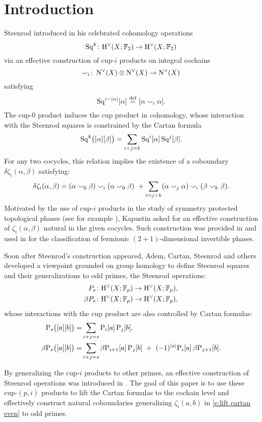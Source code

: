 
\section{Introduction} \label{s:introduction}

Steenrod introduced in \cite{steenrod1947products} his celebrated cohomology operations
\begin{equation*}
	\operatorname{Sq}^k \colon \mathrm{H}^\vee(X; {\mathbb{F}_2}) \to \mathrm{H}^\vee(X; {\mathbb{F}_2})
\end{equation*}
via an effective construction of cup-$i$ products on integral cochains
\[
\smallsmile_i \colon \operatorname{N^{\vee}}(X) \otimes \operatorname{N^{\vee}}(X) \to \operatorname{N^{\vee}}(X)
\]
satisfying
\[
\operatorname{Sq}^{i-\lvert\alpha\rvert}[\alpha] \stackrel{\mathrm{def}}{=} [\alpha \smallsmile_i \alpha].
\]
The cup-$0$ product induces the cup product in cohomology, whose interaction with the Steenrod squares is constrained by the Cartan formula
\[
\operatorname{Sq}^k\!\big([\alpha] [\beta]\big) = \sum_{i+j=k} \operatorname{Sq}^i [\alpha] \operatorname{Sq}^j[\beta].
\]
For any two cocycles, this relation implies the existence of a coboundary $\delta\zeta_i(\alpha,\beta)$ satisfying:
\begin{equation}\label{e:lift cartan even}
	\delta\zeta_i(\alpha, \beta) =
	(\alpha \smallsmile_0 \beta) \smallsmile_i (\alpha \smallsmile_0 \beta) \ +
	\sum_{i=j+k} (\alpha \smallsmile_j \alpha) \smallsmile_i (\beta \smallsmile_k \beta).
\end{equation}
Motivated by the use of cup-$i$ products in the study of symmetry protected topological phases (see for example \cite{kapustin2015cobordism, gaiotto2016spin, kapustin2017fermionic}), Kapustin asked for an effective construction of $\zeta_i(\alpha, \beta)$ natural in the given cocycles.
Such construction was provided in \cite{medina2020cartan} and used in \cite{barkeshli2021classification} for the classification of fermionic $(2+1)$-dimensional invertible phases.

Soon after Steenrod's construction appeared, Adem, Cartan, Steenrod and others developed a viewpoint grounded on group homology to define Steenrod squares and their generalizations to odd primes, the Steenrod operations:
\begin{align*}
	P_s \colon& \mathrm{H}^\vee(X; {\mathbb{F}_p}) \to \mathrm{H}^\vee(X; {\mathbb{F}_p}), \\
	\beta P_s \colon& \mathrm{H}^\vee(X; {\mathbb{F}_p}) \to \mathrm{H}^\vee(X; {\mathbb{F}_p}),
\end{align*}
whose interactions with the cup product are also controlled by Cartan formulas:
\begin{align*}
	\mathrm{P}_s\big([a][b]\big) =&
	\sum_{i+j=s} \mathrm{P}_i[a] \, \mathrm{P}_j[b], \\
	\beta\mathrm{P}_s\big([a][b]\big) =&
	\sum_{i+j=s} \beta\mathrm{P}_{i+1}[a] \, \mathrm{P}_j[b] \ +\ (-1)^{\lvert a\rvert} \mathrm{P}_i[a] \, \beta\mathrm{P}_{j+1}[b].
\end{align*}

By generalizing the cup-$i$ products to other primes, an effective construction of Steenrod operations was introduced in \cite{medina2021may_st}.
The goal of this paper is to use these cup-$(p,i)$ products to lift the Cartan formulas to the cochain level and effectively construct natural coboundaries generalizing $\zeta_i(a,b)$ in \cref{e:lift cartan even} to odd primes.